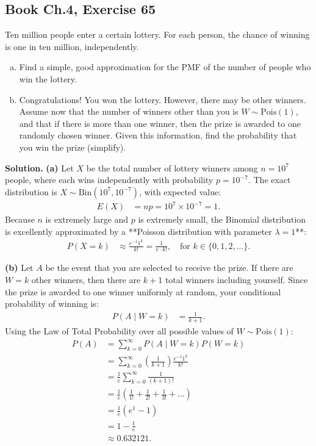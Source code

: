 \documentclass[11pt,a4paper]{article}
\begin{document}
\vspace{10pt}
\subsection{Book Ch.4, Exercise 65}
\begin{tcolorbox}[title={Book Ch.4, Exercise 65}]
Ten million people enter a certain lottery. For each person, the chance of winning is one in ten million, independently.
\begin{enumerate}[(a)]
\item Find a simple, good approximation for the PMF of the number of people who win the lottery.
\item Congratulations! You won the lottery. However, there may be other winners. Assume now that the number of winners other than you is $W \sim \text{Pois}(1)$, and that if there is more than one winner, then the prize is awarded to one randomly chosen winner. Given this information, find the probability that you win the prize (simplify).
\end{enumerate}
\end{tcolorbox}

\noindent \textbf{Solution.} \textbf{(a)} Let $X$ be the total number of lottery winners among $n = 10^7$ people, where each wins independently with probability $p = 10^{-7}$. The exact distribution is $X \sim \text{Bin}\left(10^7, 10^{-7}\right)$, with expected value:
\begin{align*}
E(X) &= n p = 10^7 \times 10^{-7} = 1.
\end{align*}
Because $n$ is extremely large and $p$ is extremely small, the Binomial distribution is excellently approximated by a **Poisson distribution with parameter $\lambda = 1$**:
\begin{align*}
P(X = k) &\approx \frac{e^{-1} 1^k}{k!} = \frac{1}{e \cdot k!}, \quad \text{for } k \in \{0, 1, 2, \dots\}.
\end{align*}

\vspace{4pt}
\noindent \textbf{(b)} Let $A$ be the event that you are selected to receive the prize. If there are $W = k$ other winners, then there are $k + 1$ total winners including yourself. Since the prize is awarded to one winner uniformly at random, your conditional probability of winning is:
\begin{align*}
P(A \mid W = k) &= \frac{1}{k + 1}.
\end{align*}
Using the Law of Total Probability over all possible values of $W \sim \text{Pois}(1)$:
\begin{align*}
P(A) &= \sum_{k=0}^{\infty} P(A \mid W = k) P(W = k) \\
&= \sum_{k=0}^{\infty} \left(\frac{1}{k + 1}\right) \frac{e^{-1} 1^k}{k!} \\
&= \frac{1}{e} \sum_{k=0}^{\infty} \frac{1}{(k + 1)!} \\
&= \frac{1}{e} \left( \frac{1}{1!} + \frac{1}{2!} + \frac{1}{3!} + \dots \right) \\
&= \frac{1}{e} (e^1 - 1) \\
&= 1 - \frac{1}{e} \\
&\approx 0.632121.
\end{align*}
\end{document}
